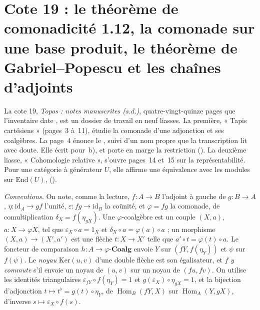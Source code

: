 \section[Cote 19 : le théorème de comonadicité 1.12, la comonade sur une base produit le théorème de Gabriel--Popescu et les chaînes d'adjoints]{Cote 19 : le théorème de comonadicité 1.12, la comonade sur une base produit, le théorème de Gabriel--Popescu et les chaînes d'adjoints\protect{}}\label{sec:19}

La cote 19, \emph{Topos : notes manuscrites (s.d.)}, quatre-vingt-quinze pages que l'inventaire date \q{[à partir de 1958-1973]}, est un dossier de travail en neuf liasses. La première, « Tapis cartésiens » (pages~3 à~11), étudie la comonade d'une adjonction et ses coalgèbres. La page~4 énonce le , suivi d'un nom propre que la transcription lit  avec doute. Elle écrit  pour~b), et porte en marge la restriction  (). La deuxième liasse, « Cohomologie relative », s'ouvre pages~14 et~15 sur la représentabilité. Pour une catégorie à générateur $U$, elle affirme une équivalence avec les modules sur $\mathrm{End}(U)$,  ().

\noindent\emph{Conventions.} On note, comme la lecture, $f : A \to B$ l'adjoint à gauche de $g : B \to A$, $\eta : \mathrm{id}_A \to gf$ l'unité, $\varepsilon : fg \to \mathrm{id}_B$ la coünité, et $\varphi = fg$ la comonade, de comultiplication $\delta_X = f(\eta_{gX})$. Une $\varphi$-coalgèbre est un couple $(X, a)$, $a : X \to \varphi X$, tel que $\varepsilon_X \circ a = 1_X$ et $\delta_X \circ a = \varphi(a) \circ a$ ; un morphisme $(X, a) \to (X', a')$ est une flèche $t : X \to X'$ telle que $a' \circ t = \varphi(t) \circ a$. Le foncteur de comparaison $h : A \to \varphi\text{-}\mathbf{Coalg}$ envoie $Y$ sur $(fY, f(\eta_Y))$ et $\psi$ sur $f(\psi)$. Le \emph{noyau} $\mathrm{Ker}(u, v)$ d'une double flèche est son égalisateur, et $f$ \emph{y commute} s'il envoie un noyau de $(u, v)$ sur un noyau de $(fu, fv)$. On utilise les identités triangulaires $\varepsilon_{fY} \circ f(\eta_Y) = 1$ et $g(\varepsilon_X) \circ \eta_{gX} = 1$, et la bijection d'adjonction $t \mapsto t^\flat = g(t) \circ \eta_Y$, de $\operatorname{Hom}_B(fY, X)$ sur $\operatorname{Hom}_A(Y, gX)$, d'inverse $s \mapsto \varepsilon_X \circ f(s)$.

